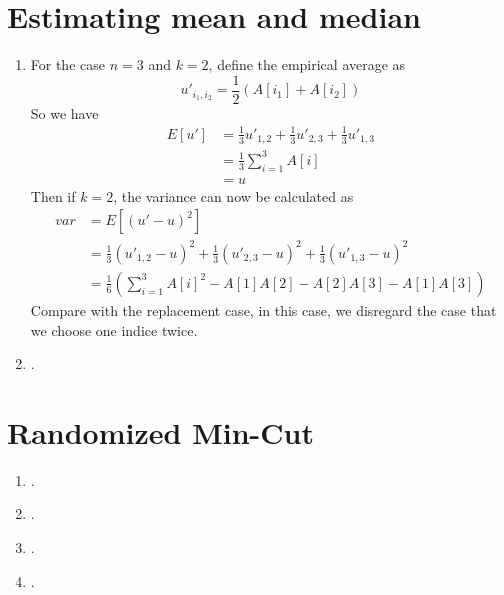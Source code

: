 \documentclass{article}
\begin{document}
	\section{Estimating mean and median}
		\begin{enumerate}
			\item For the case $n = 3$ and $k = 2$, define the empirical average as \begin{equation}
				u'_{i_1,i_2} = \frac{1}{2}(A\left[i_1\right] + A\left[i_2\right]) 
			\end{equation}
			So we have \begin{align}
				E\left[u'\right] &= \frac{1}{3} u'_{1, 2} + \frac{1}{3} u'_{2, 3} + \frac{1}{3}u'_{1, 3} \\
					&= \frac{1}{3}  \sum_{i = 1}^3 A\left[i\right]\\
					&= u
			\end{align}
			Then if $k = 2$, the variance can now be calculated as \begin{align}
				var &= E\left[(u' - u)^2 \right] \\
					   &= \frac{1}{3}(u'_{1, 2} - u)^2 + \frac{1}{3}(u'_{2, 3} - u)^2 + \frac{1}{3}(u'_{1, 3} - u)^2 \\
					   &= \frac{1}{6}(\sum_{i = 1}^3 A\left[i\right]^2 - A\left[1\right]A\left[2\right] - A\left[2\right]A\left[3\right] - A\left[1\right]A\left[3\right])
				\end{align}
			Compare with the replacement case, in this case, we disregard the case that we choose one indice twice. 
			\item .
		\end{enumerate}

	\section{Randomized Min-Cut}
		\begin{enumerate}
			\item .
			\item .
			\item .
			\item .
		\end{enumerate}
\end{document}
